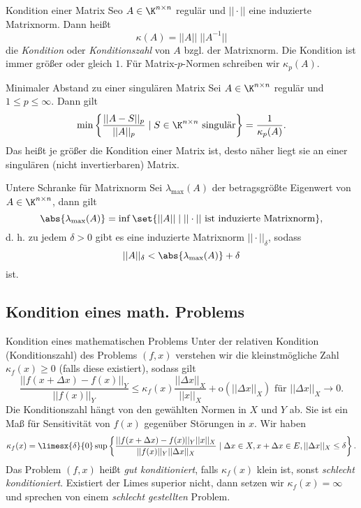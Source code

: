 \begin{karte}{Kondition einer Matrix}
    Seo \( A \in \K^{n\times n} \) regulär und \( ||\cdot|| \) eine induzierte 
    Matrixnorm. Dann heißt 
    \[ \kappa(A) = ||A|| \; ||A^{-1}|| \]
    die \textit{Kondition} oder \textit{Konditionszahl} von \(A\) bzgl. der Matrixnorm.
    Die Kondition ist immer größer oder gleich \(1\). Für Matrix-\(p\)-Normen schreiben wir 
    \( \kappa_p(A) \).
\end{karte}

\begin{karte}{Minimaler Abstand zu einer singulären Matrix}
    Sei \( A \in \K^{n\times n} \) regulär und \( 1 \leq p \leq \infty \). 
    Dann gilt 
    \[ \min \left\{ \frac{||A-S||_p}{||A||_p} \; | \; S \in \K^{n\times n} \text{ singulär} \right\} = \frac{1}{\kappa_p(A)}. \]
    Das heißt je größer die Kondition einer Matrix ist, desto näher liegt sie an einer singulären 
    (nicht invertierbaren) Matrix.
\end{karte}

\begin{karte}{Untere Schranke für Matrixnorm}
    Sei \( \lambda_{\max}(A) \) der betragsgrößte Eigenwert von \( A \in \K^{n\times n} \), 
    dann gilt 
    \[ \abs{ \lambda_{\max}(A)} = \inf \set{ ||A|| \;|\; ||\cdot|| \text{ ist induzierte Matrixnorm} }, \]
    d. h. zu jedem \(\delta > 0\) gibt es eine induzierte Matrixnorm \( ||\cdot||_\delta \), 
    sodass 
    \[ ||A||_\delta < \abs{\lambda_{\max}(A)} + \delta \]
    ist.
\end{karte}

\subsection*{Kondition eines math. Problems}

\begin{karte}{Kondition eines mathematischen Problems}
    Unter der relativen Kondition (Konditionszahl) des Problems 
    \( (f,x) \) verstehen wir die kleinstmögliche Zahl 
    \( \kappa_f(x) \geq 0 \) (falls diese existiert), sodass gilt 
    \[ \frac{ || f(x + \Delta x) - f(x) ||_Y }{ || f(x) ||_Y } \leq \kappa_f(x) \frac{ ||\Delta x||_X }{||x||_X} + \mathrm{o}(||\Delta x||_X) \text{ für } ||\Delta x||_X \rightarrow 0. \]
    Die Konditionszahl hängt von den gewählten Normen in \(X\) und \(Y\) ab. Sie ist ein Maß für 
    Sensitivität von \(f(x)\) gegenüber Störungen in \(x\). Wir haben 
    \[ \kappa_f(x) = \limesx{\delta}{0}\sup \left\{ \frac{ || f(x+\Delta x) - f(x) ||_Y ||x||_X }{ ||f(x)||_Y ||\Delta x||_X } \;|\; \Delta x \in X, x + \Delta x \in E, ||\Delta x ||_X\leq \delta \right\}. \]
    Das Problem \( (f,x) \) heißt \textit{gut konditioniert}, falls \( \kappa_f(x) \) klein ist, sonst \textit{schlecht konditioniert}.
    Existiert der Limes superior nicht, dann setzen wir \( \kappa_f(x) = \infty \) und sprechen von einem 
    \textit{schlecht gestellten} Problem.
\end{karte}

